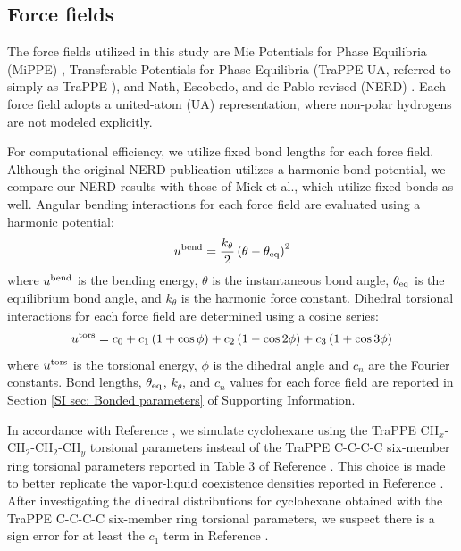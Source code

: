 \documentclass[journal=jced,manuscript=article]{achemso}
\begin{document}
\subsection{Force fields} \label{sec: Force fields}

    The force fields utilized in this study are Mie Potentials for Phase Equilibria (MiPPE) \cite{Mie,Potoff_branched,Barhaghi2017}, Transferable Potentials for Phase Equilibria (TraPPE-UA, referred to simply as TraPPE \cite{TraPPE,Martin1999,Keasler2012}), and Nath, Escobedo, and de Pablo revised (NERD) \cite{NERD,Nath2001}. Each force field adopts a united-atom (UA) representation, where non-polar hydrogens are not modeled explicitly. 
    
    
    For computational efficiency, we utilize fixed bond lengths for each force field. Although the original NERD publication\cite{NERD} utilizes a harmonic bond potential, we compare our NERD results with those of Mick et al.\cite{Potoff_branched}, which utilize fixed bonds as well. Angular bending interactions for each force field are evaluated using a harmonic potential:
    \begin{equation}
    u^{\rm bend} = \frac{k_\theta}{2} \left(\theta-\theta_{\rm eq}\right)^2
    \end{equation}
    where $u^{\rm bend}$ is the bending energy, $\theta$ is the instantaneous bond angle, $\theta_{\rm eq}$ is the equilibrium bond angle, and $k_\theta$ is the harmonic force constant. Dihedral torsional interactions for each force field are determined using a cosine series:
    \begin{equation}
    u^{\rm tors} = c_0 + c_1 \left(1+\cos{\phi}\right) + c_2 \left(1-\cos{2\phi}\right) + c_3 \left(1+\cos{3\phi}\right)
    \end{equation}
    where $u^{\rm tors}$ is the torsional energy, $\phi$ is the dihedral angle and $c_n$ are the Fourier constants. Bond lengths, $\theta_{\rm eq}$, $k_\theta$, and $c_n$ values for each force field are reported in Section \ref{SI sec: Bonded parameters} of Supporting Information.
    
    In accordance with Reference , we simulate cyclohexane using the TraPPE CH$_x$-CH$_2$-CH$_2$-CH$_y$ torsional parameters instead of the TraPPE C-C-C-C six-member ring torsional parameters reported in Table 3 of Reference . This choice is made to better replicate the vapor-liquid coexistence densities reported in Reference . After investigating the dihedral distributions for cyclohexane obtained with the TraPPE C-C-C-C six-member ring torsional parameters, we suspect there is a sign error for at least the $c_1$ term in Reference .
    
\end{document}
